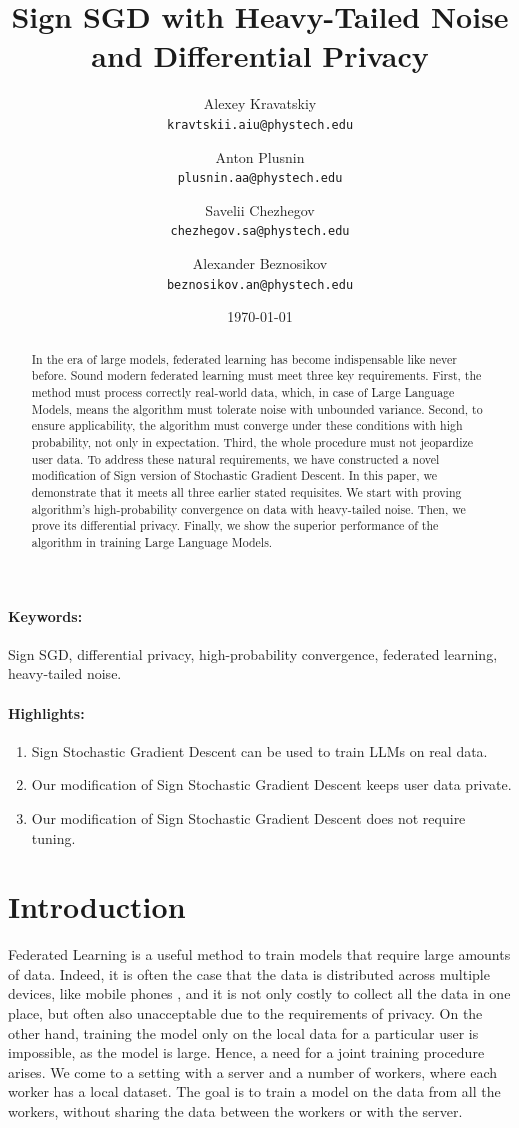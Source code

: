 \documentclass[12pt]{article}
\title{Sign SGD with Heavy-Tailed Noise and Differential Privacy}
\author{
  Alexey Kravatskiy\\
  \texttt{kravtskii.aiu@phystech.edu}
  \and
  Anton Plusnin\\
  \texttt{plusnin.aa@phystech.edu}
  \and
  Savelii Chezhegov\\
  \texttt{chezhegov.sa@phystech.edu}
  \and
  Alexander Beznosikov\\
  \texttt{beznosikov.an@phystech.edu}
}
\date{\today}
\begin{document}
\maketitle

\begin{abstract}
In the era of large models, federated learning has become indispensable like never before. Sound modern federated learning must meet three key requirements. First, the method must process correctly real-world data, which, in case of Large Language Models, means the algorithm must tolerate noise with unbounded variance. Second, to ensure applicability, the algorithm must converge under these conditions with high probability, not only in expectation. Third, the whole procedure must not jeopardize user data. To address these natural requirements, we have constructed a novel modification of Sign version of Stochastic Gradient Descent. In this paper, we demonstrate that it meets all three earlier stated requisites. We start with proving algorithm's high-probability convergence on data with heavy-tailed noise. Then, we prove its differential privacy. Finally, we show the superior performance of the algorithm in training Large Language Models.

\end{abstract}

\paragraph{Keywords:} Sign SGD, differential privacy, high-probability convergence, federated learning, heavy-tailed noise.

\paragraph{Highlights:}
\begin{enumerate}
\item Sign Stochastic Gradient Descent can be used to train LLMs on real data.
\item Our modification of Sign Stochastic Gradient Descent keeps user data private.
\item Our modification of Sign Stochastic Gradient Descent does not require tuning.
\end{enumerate}

\section{Introduction}
Federated Learning is a useful method to train models that require large amounts of data. Indeed, it is often the case that the data is distributed across multiple devices, like mobile phones \parencite{McMahan2017}, and it is not only costly to collect all the data in one place, but often also unacceptable due to the requirements of privacy. On the other hand, training the model only on the local data for a particular user is impossible, as the model is large. Hence, a need for a joint training procedure arises. We come to a setting with a server and a number of workers, where each worker has a local dataset. The goal is to train a model on the data from all the workers, without sharing the data between the workers or with the server.
\end{document}
